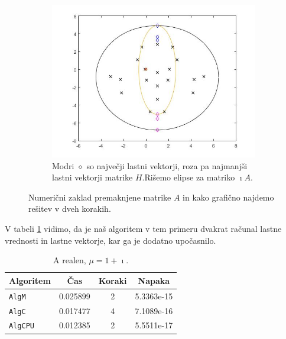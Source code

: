 \documentclass[12pt,a4paper]{amsart}
\theoremstyle{definition}
\theoremstyle{plain}
\begin{document}
\begin{figure}[H]
\begin{subfigure}[t]{0.5\textwidth}
\includegraphics[width=0.9\linewidth]{RC2e2.jpg}
\caption{Modri $\diamond$ so največji lastni vektorji, roza pa najmanjši lastni vektorji matrike $H$.\footnotemark[\value{footnote}] Rišemo elipse za matriko $\imath A$.}
\label{fig:p43}
\end{subfigure}
\caption{Numerični zaklad premaknjene matrike $A$ in kako grafično najdemo rešitev v dveh korakih.}
\end{figure}
V tabeli \ref{t4} vidimo, da je naš algoritem v tem primeru dvakrat računal lastne vrednosti in lastne vektorje, kar ga je dodatno upočasnilo.
\begin{table}[H]
\caption{A realen, $\mu = 1 + \imath$.}
\begin{tabular}{|l|c|c|c|}
\hline
Algoritem & Čas & Koraki & Napaka\\
\hline
\hline
\verb+AlgM+ &0.025899&2&5.3363e-15\\
\hline
\verb+AlgC+ &0.017477 &4 &7.1089e-16 \\
\hline
\verb+AlgCPU+ &0.012385&2&5.5511e-17\\
\hline
\end{tabular}

\label{t4}
\end{table}
\end{document}
